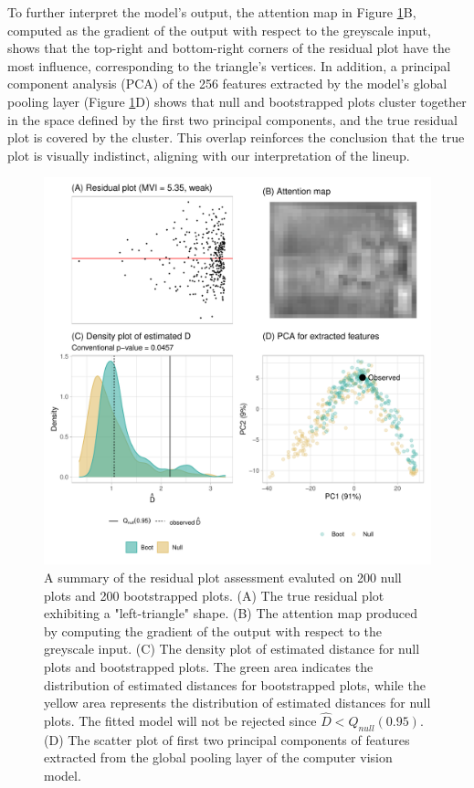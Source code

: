 \documentclass[]{interact}
\theoremstyle{plain}%
\theoremstyle{definition}
\theoremstyle{remark}
\begin{document}
To further interpret the model's output, the attention map in Figure
\ref{fig:false-check}B, computed as the gradient of the output with
respect to the greyscale input, shows that the top-right and
bottom-right corners of the residual plot have the most influence,
corresponding to the triangle's vertices. In addition, a principal
component analysis (PCA) of the 256 features extracted by the model's
global pooling layer (Figure \ref{fig:false-check}D) shows that null and
bootstrapped plots cluster together in the space defined by the first
two principal components, and the true residual plot is covered by the
cluster. This overlap reinforces the conclusion that the true plot is
visually indistinct, aligning with our interpretation of the lineup.

\begin{figure}[!h]

{\centering \includegraphics[width=0.8\linewidth]{paper_files/figure-latex/false-check-1} 

}

\caption{A summary of the residual plot assessment evaluted on 200 null plots and 200 bootstrapped plots. (A) The true residual plot exhibiting a "left-triangle" shape. (B) The attention map produced by computing the gradient of the output with respect to the greyscale input.  (C) The density plot of estimated distance for null plots and bootstrapped plots. The green area indicates the distribution of estimated distances for bootstrapped plots, while the yellow area represents the distribution of estimated distances for null plots. The fitted model will not be rejected since $\hat{D} < Q_{null}(0.95)$. (D) The scatter plot of first two principal components of features extracted from the global pooling layer of the computer vision model.  }\label{fig:false-check}
\end{figure}
\end{document}
